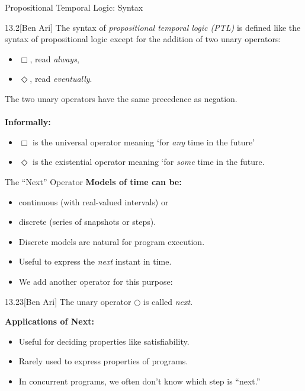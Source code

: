 \begin{slide}[bm=,toc=]{Propositional Temporal Logic: Syntax}
\begin{defn}{13.2}[Ben Ari]
The syntax of \emph{propositional temporal logic (PTL)} is defined like
the syntax of propositional logic except for the addition of two unary
operators:
\end{defn}
\vspace{-2ex}
\begin{itemize}
\item $\Box$, read \emph{always},
\item $\Diamond$, read \emph{eventually}.
\end{itemize}
The two unary operators have the same precedence as negation.\\~\\
{\bf Informally:}
\begin{itemize}
\item $\Box$ is the universal operator meaning `for \emph{any} time in the
future'
\item $\Diamond$ is the existential operator meaning `for \emph{some} time in
the future.
\end{itemize}
\end{slide}

\begin{wideslide}[bm=,toc=]{The ``Next'' Operator}
{\bf Models of time can be:}
\begin{itemize}
\item continuous (with real-valued intervals) or
\item discrete (series of snapshots or steps).
\item Discrete models are natural for program execution.
\item Useful to express the \emph{next} instant in time.
\item We add another operator for this purpose:
\end{itemize}
\begin{defn}{13.23}[Ben Ari]
The unary operator $\Circle$ is called \emph{next}.
\end{defn}
{\bf Applications of Next:}
\begin{itemize}
\item Useful for deciding properties like satisfiability.
\item Rarely used to express properties of programs.
\item In concurrent programs, we often don't know which step is ``next.''
\end{itemize}
\end{wideslide}
